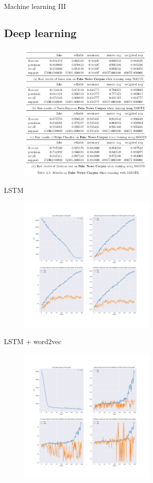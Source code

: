 \documentclass{beamer}
\begin{document}
	\begin{frame}{Machine learning III}
	\subsection{Deep learning}
	\begin{figure}
		\centering
			\includegraphics[width=0.6\textwidth]{res3.png}
		\end{figure}
	\end{frame}
	\begin{frame}{LSTM}
		\begin{figure}
			\centering
			\includegraphics[width=0.6\textwidth]{lstm1.pdf}
		\end{figure}
	\end{frame}
	\begin{frame}{LSTM + word2vec}
	\begin{figure}
			\centering
			\includegraphics[width=0.6\textwidth]{lstm2.pdf}
		\end{figure}
	\end{frame}
\end{document}
